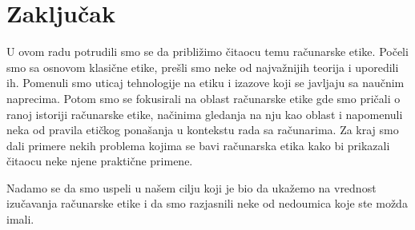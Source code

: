 \documentclass[a4paper]{article}
\begin{document}
\section{Zaključak}
\label{sec:zakljucak}

U ovom radu potrudili smo se da približimo čitaocu temu računarske etike. Počeli smo sa osnovom klasične etike, prešli smo neke od najvažnijih teorija i uporedili ih. Pomenuli smo uticaj tehnologije na etiku i izazove koji se javljaju sa naučnim naprecima.
Potom smo se fokusirali na oblast računarske etike gde smo pričali o ranoj istoriji računarske etike, načinima gledanja na nju kao oblast i napomenuli neka od pravila etičkog ponašanja u kontekstu rada sa računarima. Za kraj smo dali primere nekih problema kojima se bavi računarska etika kako bi prikazali čitaocu neke njene praktične primene.

Nadamo se da smo uspeli u našem cilju koji je bio da ukažemo na vrednost izučavanja računarske etike i da smo razjasnili neke od nedoumica koje ste možda imali.

\appendix
 


\appendix
\end{document}
